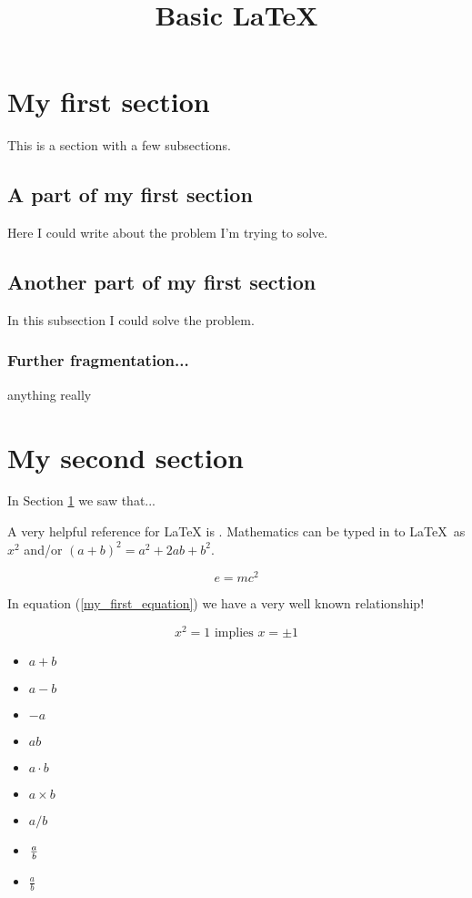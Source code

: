 \documentclass{article}
\title{Basic LaTeX}
\begin{document}
\section{My first section}\label{first_section}

This is a section with a few subsections.

\subsection{A part of my first section}

Here I could write about the problem I'm trying to solve.

\subsection{Another part of my first section}

In this subsection I could solve the problem.

\subsubsection{Further fragmentation...}
anything really

\section{My second section}\label{second_section}

In Section \ref{first_section} we saw that...

A very helpful reference for LaTeX is \cite{Gratzer2007}.
Mathematics can be typed in to \LaTeX\ as $x^2$ and/or \((a+b)^2=a^2+2ab+b^2\).

\begin{equation}\label{my_first_equation}
e=mc^2
\end{equation}

In equation (\ref{my_first_equation}) we have a very well known relationship!

$$x^2 = 1 \text{ implies } x=\pm1$$

\begin{itemize}
    \item $a+b$
    \item $a-b$
    \item $-a$
    \item $ab$
    \item $a\cdot b$
    \item $a\times b$
    \item $a/b$
    \item ${a\over b}$
    \item $\frac{a}{b}$
\end{itemize}
\end{document}
